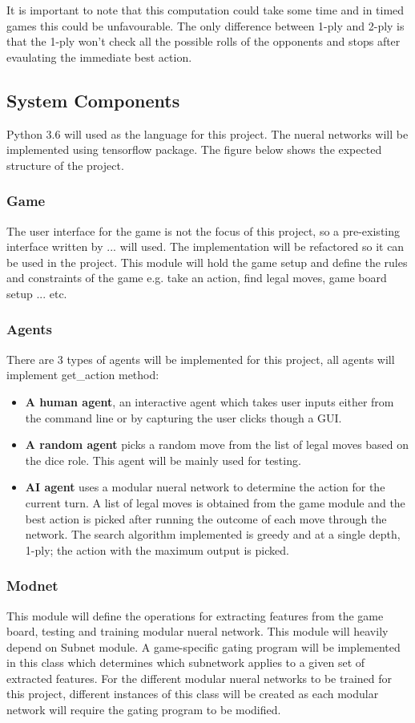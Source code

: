 \documentclass[12pt,a4paper]{article}
\begin{document}
It is important to note that this computation could take some time and in timed games this could be unfavourable. The only difference between 1-ply and 2-ply is that the 1-ply won't check all the possible rolls of the opponents and stops after evaulating the immediate best action.


\subsection{System Components}
Python 3.6 will used as the language for this project. The nueral networks will be implemented using tensorflow package. The figure below shows the expected structure of the project.


\subsubsection{Game}
The user interface for the game is not the focus of this project, so a pre-existing interface written by ... will used. The implementation will be refactored so it can be used in the project. This module will hold the game setup and define the rules and constraints of the game e.g. take an action, find legal moves, game board setup ... etc.

\subsubsection{Agents}
There are 3 types of agents will be implemented for this project, all agents will implement get\_action method: 
\begin{itemize}
    \item \textbf{A human agent}, an interactive agent which takes user inputs either from the command line or by capturing the user clicks though a GUI.
    \item \textbf{A random agent} picks a random move from the list of legal moves based on the dice role. This agent will be mainly used for testing.
    \item \textbf{AI agent} uses a modular nueral network to determine the action for the current turn. A list of legal moves is obtained from the game module and the best action is picked after running the outcome of each move through the network. The search algorithm implemented is greedy and at a single depth, 1-ply; the action with the maximum output is picked.
\end{itemize}

\subsubsection{Modnet}
This module will define the operations for extracting features from the game board, testing and training modular nueral network. This module will heavily depend on Subnet module. A game-specific gating program will be implemented in this class which determines which subnetwork applies to a given set of extracted features. For the different modular nueral networks to be trained for this project, different instances of this class will be created as each modular network will require the gating program to be modified.
\end{document}
